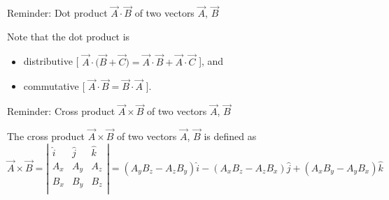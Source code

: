 {\begin{frame}{Reminder: Dot product $\vec{A} \cdot \vec{B}$ of two vectors $\vec{A}$, $\vec{B}$}
\vspace{0.3cm}

Note that the dot product is
\begin{itemize}
   \item distributive [ $\vec{A} \cdot \Big( \vec{B} + \vec{C} \Big) = \vec{A} \cdot \vec{B} + \vec{A} \cdot \vec{C}$ ], and
   \item commutative [ $\vec{A} \cdot \vec{B} = \vec{B} \cdot \vec{A}$ ].
\end{itemize}

\end{frame}


%
%
%

\begin{frame}{Reminder: Cross product $\vec{A} \times \vec{B}$ of two vectors $\vec{A}$, $\vec{B}$}

The cross product $\vec{A} \times \vec{B}$ of two vectors $\vec{A}$, $\vec{B}$ is defined as
\begin{equation*}
     \vec{A} \times \vec{B} =
       \left|
          \begin{array}{ccc}
             \hat{i} & \hat{j} & \hat{k} \\
             A_x     & A_y     & A_z     \\
             B_x     & B_y     & B_z     \\
          \end{array}
       \right| =
       (A_y B_z - A_z B_y) \hat{i} - (A_x B_z - A_z B_x) \hat{j} + (A_x B_y - A_y B_x) \hat{k}
\end{equation*}


\end{frame}}
